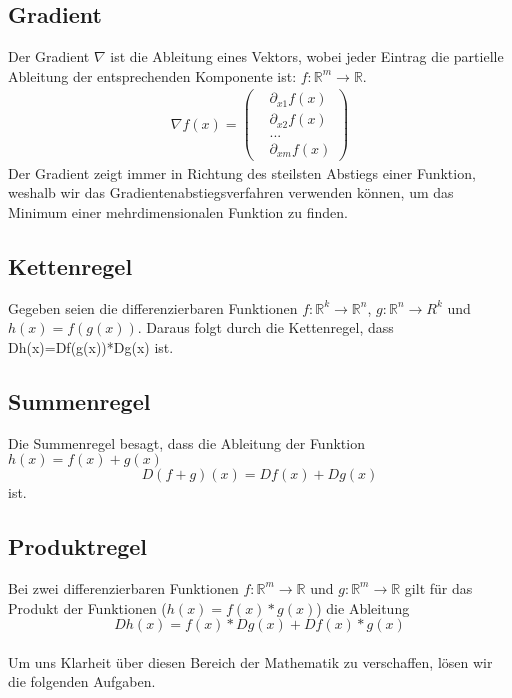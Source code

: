 \documentclass{article}
\begin{document}
\begin{multicols}{2}
\subsection{Gradient}
Der Gradient $\nabla$ ist die Ableitung eines Vektors, wobei jeder Eintrag die partielle Ableitung der entsprechenden Komponente ist:
$f:\mathds{R}^m\rightarrow\mathds{R}$.
\begin{equation} \begin{split} \nabla f(x) = \left( \begin{array}{c}
& \partial_{x1} f(x) \\ & \partial_{x2} f(x) \\ & ... \\ & \partial_{xm} f(x)
\end{array}
\right)
\end{split} \end{equation} 
Der Gradient zeigt immer in Richtung des steilsten Abstiegs einer Funktion, weshalb wir das Gradientenabstiegsverfahren verwenden können, um das Minimum einer mehrdimensionalen Funktion zu finden.
\subsection{Kettenregel}
Gegeben seien die differenzierbaren Funktionen $f:\mathds{R}^k\rightarrow\mathds{R}^n$, $g:\mathds{R}^n\rightarrow{R}^k$ und $h(x)=f(g(x))$. Daraus folgt durch die Kettenregel, dass Dh(x)=Df(g(x))*Dg(x) ist.
\subsection{Summenregel}
Die Summenregel besagt, dass die Ableitung der Funktion $h(x)=f(x)+g(x)$ \begin{equation*} D(f + g)(x)=Df(x)+Dg(x)\end{equation*} ist.
\subsection {Produktregel}
Bei zwei differenzierbaren Funktionen $f:\mathds{R}^m\rightarrow\mathds{R}$ und $g:\mathds{R}^m\rightarrow\mathds{R}$ gilt für das Produkt der Funktionen ($h(x)=f(x)*g(x)$) die Ableitung \begin{equation*}Dh(x)=f(x)*Dg(x)+Df(x)*g(x)\end{equation*}
\\
Um uns Klarheit über diesen Bereich der Mathematik zu verschaffen, l\"osen wir die folgenden Aufgaben.
\vspace{15pt}


\end{multicols}
\end{document}
